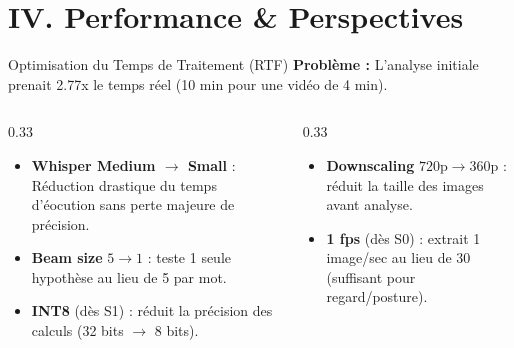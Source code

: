 \documentclass[10pt,aspectratio=169]{beamer}
\begin{document}
\section{IV. Performance \& Perspectives}

\begin{frame}{Optimisation du Temps de Traitement (RTF)}
    \small
    \textbf{Problème :} L'analyse initiale prenait 2.77x le temps réel (10 min pour une vidéo de 4 min).
    
    \vspace{0.3cm}
    \begin{columns}[T]
        \hspace{-0.3cm}
        \begin{column}{0.33\textwidth}
            \begin{tcolorbox}[title=\textbf{Levier Audio}, colframe=primary!60, colback=primary!3]
                \scriptsize
                \begin{itemize}
                    \item \textbf{Whisper Medium $\rightarrow$ Small} : Réduction drastique du temps d'éocution sans perte majeure de précision.
                    \item \textbf{Beam size} $5 \rightarrow 1$ : teste 1 seule hypothèse au lieu de 5 par mot.
                    \item \textbf{INT8} (dès S1) : réduit la précision des calculs (32 bits $\rightarrow$ 8 bits).
                \end{itemize}
            \end{tcolorbox}
        \end{column}
        \begin{column}{0.33\textwidth}
            \begin{tcolorbox}[title=\textbf{Levier Vision}, colframe=accent!60, colback=accent!3]
                \scriptsize
                \begin{itemize}
                    \item \textbf{Downscaling} $720 \text{p} \rightarrow 360\text{p}$ : réduit la taille des images avant analyse.
                    \item \textbf{1 fps} (dès S0) : extrait 1 image/sec au lieu de 30 (suffisant pour regard/posture).
                \end{itemize}
            \end{tcolorbox}

\end{column}
\end{columns}
\end{frame}
\end{document}
